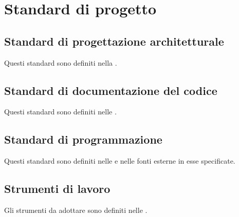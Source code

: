 \section{Standard di progetto}
\subsection{Standard di progettazione architetturale}
Questi standard sono definiti nella \SpecificaTecnica{}.

\subsection{Standard di documentazione del codice}
Questi standard sono definiti nelle \NormeDiProgetto{}.

\subsection{Standard di programmazione}
Questi standard sono definiti nelle \NormeDiProgetto{} e nelle fonti esterne in esse specificate.

\subsection{Strumenti di lavoro}
Gli strumenti da adottare sono definiti nelle \NormeDiProgetto{}.
